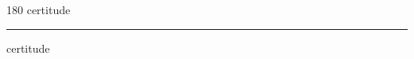 
\begin{frame}
\begin{center}
\begin{turn}{180}
{\fontsize{2.5cm}{1em}\selectfont certitude}
\end{turn}
\vspace{1em}\par  
\hrule
\vspace{1em}\par  
{\fontsize{2.5cm}{1em}\selectfont certitude}
\end{center}
\end{frame}
